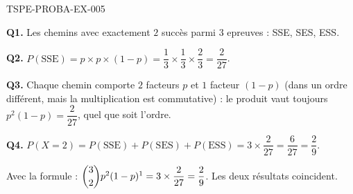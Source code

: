 \begin{corrige}{TSPE-PROBA-EX-005}

\textbf{Q1.} Les chemins avec exactement $2$ succès parmi $3$ epreuves : SSE, SES, ESS.

\textbf{Q2.} $P(\text{SSE}) = p\times p\times(1-p) = \dfrac{1}{3}\times\dfrac{1}{3}\times\dfrac{2}{3} = \dfrac{2}{27}$.

\textbf{Q3.} Chaque chemin comporte $2$ facteurs $p$ et $1$ facteur $(1-p)$ (dans un ordre différent, mais la multiplication est commutative) : le produit vaut toujours $p^2(1-p) = \dfrac{2}{27}$, quel que soit l'ordre.

\textbf{Q4.} $P(X=2) = P(\text{SSE})+P(\text{SES})+P(\text{ESS}) = 3\times\dfrac{2}{27} = \dfrac{6}{27} = \dfrac{2}{9}$.

Avec la formule : $\dbinom{3}{2}p^2(1-p)^1 = 3\times\dfrac{2}{27} = \dfrac{2}{9}$. Les deux résultats coincident.

\end{corrige}
